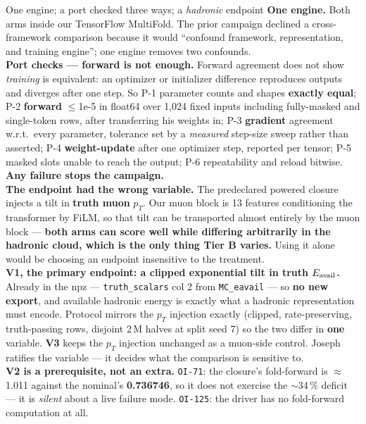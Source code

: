 \documentclass[aspectratio=169,10pt]{beamer}
\newcommand{\warn}[1]{\textcolor{warn}{#1}}
\begin{document}
\begin{frame}[t]{One engine; a port checked three ways; a \emph{hadronic} endpoint}
  \vspace{0.3em}
  {\scriptsize
  \textbf{One engine.} Both arms inside our TensorFlow MultiFold. The prior campaign
  declined a cross-framework comparison because it would ``confound framework,
  representation, and training engine''; one engine removes two confounds.
  \\[0.3em]
  \warn{\textbf{Port checks --- forward is not enough.}} Forward agreement does not show
  \emph{training} is equivalent: an optimizer or initializer difference reproduces
  outputs and diverges after one step. So P-1 parameter counts and shapes \textbf{exactly
  equal}; P-2 \textbf{forward} $\le$1e-5 in float64 over 1{,}024 fixed inputs including
  fully-masked and single-token rows, after transferring his weights in; P-3
  \textbf{gradient} agreement w.r.t.\ every parameter, tolerance set by a \emph{measured}
  step-size sweep rather than asserted; P-4 \textbf{weight-update} after one optimizer
  step, reported per tensor; P-5 masked slots unable to reach the output; P-6
  repeatability and reload bitwise. \textbf{Any failure stops the campaign.}
  \\[0.3em]
  \warn{\textbf{The endpoint had the wrong variable.}} The predeclared powered closure
  injects a tilt in \textbf{truth muon} $p_T$. Our muon block is 13 features conditioning
  the transformer by FiLM, so that tilt can be transported almost entirely by the muon
  block --- \textbf{both arms can score well while differing arbitrarily in the hadronic
  cloud, which is the only thing Tier B varies.} Using it alone would be choosing an
  endpoint insensitive to the treatment.
  \\[0.3em]
  \textbf{V1, the primary endpoint: a clipped exponential tilt in truth $E_{\rm avail}$.}
  Already in the npz --- \texttt{truth\_scalars} col 2 from \texttt{MC\_eavail} --- so
  \textbf{no new export}, and available hadronic energy is exactly what a hadronic
  representation must encode. Protocol mirrors the $p_T$ injection exactly (clipped,
  rate-preserving, truth-passing rows, disjoint 2\,M halves at split seed 7) so the two
  differ in \textbf{one} variable. \textbf{V3} keeps the $p_T$ injection unchanged as a
  muon-side control. \warn{Joseph ratifies the variable} --- it decides what the
  comparison is sensitive to.
  \\[0.3em]
  \textbf{V2 is a prerequisite, not an extra.} \texttt{OI-71}: the closure's fold-forward
  is $\approx$1.011 against the nominal's \textbf{0.736746}, so \warn{it does not exercise
  the $\sim$34\,\% deficit --- it is \emph{silent} about a live failure mode.}
  \texttt{OI-125}: the driver has \warn{no fold-forward computation} at all.}
\end{frame}
\end{document}
